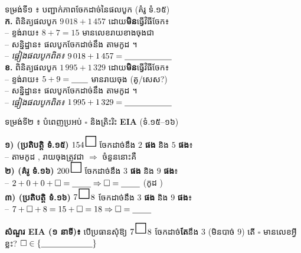 \documentclass[11pt,a4paper]{article}
\newcommand{\en}[1]{{\LatinFont #1}}
\newcommand{\enbf}[1]{{\LatinFont\textbf{#1}}}
\newcommand{\cnum}[1]{{\fontsize{10pt}{11pt}\selectfont\ding{\numexpr181+#1\relax}}\hspace{0.15em}}
\newcommand{\blank}[1]{\underline{\hspace{#1}}}
\newcommand{\numbox}{\tikz[baseline=-0.35ex]\draw[black,line width=0.85pt] (0,0) rectangle (0.42,0.42);}
\begin{document}
\vspace{2pt}
\begin{minipage}[t]{9.2cm}
  \vspace{0pt}
  \begin{tcolorbox}[
    enhanced, sharp corners, colback=white, colframe=black,
    boxrule=0.85pt, boxsep=2pt, top=5pt, bottom=6pt, left=5.5pt, right=5.5pt,
    equal height group=e4boxes
  ]
    {\muol\fontsize{8.7pt}{12.5pt}\selectfont ទម្រង់ទី១ ៖ បញ្ជាក់ភាពចែកដាច់នៃផលបូក (គំរូ ទំ.១៥)}\\[5pt]
    {\fontsize{8.7pt}{14.2pt}\selectfont
    \textbf{ក.} ពិនិត្យផលបូក $9\,018 + 1\,457$ ដោយ\textbf{មិន}ធ្វើវិធីចែក៖\\
    -- ខ្ទង់រាយ៖ $8 + 7 = 15$ មានលេខរាយខាងចុងជា \blank{0.7cm}\\
    -- សន្និដ្ឋាន៖ ផលបូកចែកដាច់នឹង \blank{0.7cm} តាមកូដ \blank{0.7cm} ។\\
    -- \textit{ផ្ទៀងផលបូកពិត៖} $9\,018 + 1\,457 = \blank{2.0cm}$\\[9pt]
    \textbf{ខ.} ពិនិត្យផលបូក $1\,995 + 1\,329$ ដោយ\textbf{មិន}ធ្វើវិធីចែក៖\\
    -- ខ្ទង់រាយ៖ $5 + 9 = \blank{0.7cm}$ មានរាយចុង \blank{0.7cm} (គូ/សេស?)\\
    -- សន្និដ្ឋាន៖ ផលបូកចែកដាច់នឹង \blank{0.7cm} តាមកូដ \blank{0.7cm} ។\\
    -- \textit{ផ្ទៀងផលបូកពិត៖} $1\,995 + 1\,329 = \blank{2.0cm}$}
  \end{tcolorbox}
\end{minipage}\hfill%
\begin{minipage}[t]{9.3cm}
  \vspace{0pt}
  \begin{tcolorbox}[
    enhanced, sharp corners, colback=white, colframe=black,
    boxrule=0.85pt, boxsep=2pt, top=5pt, bottom=6pt, left=5.5pt, right=5.5pt,
    equal height group=e4boxes
  ]
    {\muol\fontsize{8.7pt}{12.5pt}\selectfont ទម្រង់ទី២ ៖ បំពេញប្រអប់ $\square$ និងត្រិះរិះ \enbf{EIA} (ទំ.១៥--១៦)}\\[5pt]
    {\fontsize{8.7pt}{14.0pt}\selectfont
    \textbf{១) (ប្រតិបត្តិ ទំ.១៥)} $154\,\numbox$ ចែកដាច់នឹង $2$ \textbf{ផង} និង $5$ \textbf{ផង}៖\\
    -- តាមកូដ \cnum{1}, \cnum{2} រាយចុងត្រូវជា \blank{0.8cm} $\Rightarrow$ ចំនួននោះគឺ \blank{1.6cm}\\[5pt]
    \textbf{២) (គំរូ ទំ.១៦)} $200\,\numbox$ ចែកដាច់នឹង $3$ \textbf{ផង} និង $9$ \textbf{ផង}៖\\
    -- $2+0+0+\square = \blank{0.8cm} \Rightarrow \square = \blank{0.8cm}$ (កូដ \blank{0.9cm})\\[5pt]
    \textbf{៣) (ប្រតិបត្តិ ទំ.១៦)} $7\,\numbox\,8$ ចែកដាច់នឹង $3$ \textbf{ផង} និង $9$ \textbf{ផង}៖\\
    -- $7+\square+8 = 15+\square = 18 \Rightarrow \square = \blank{0.8cm}$\\[6pt]
    \colorbox{panelgray}{\parbox{8.35cm}{\textbf{សំណួរ \en{EIA} (១ នាទី)៖} បើប្រធានសុំឱ្យ $7\,\numbox\,8$ ចែកដាច់\textbf{តែ}នឹង $3$ (មិនបាច់ $9$) តើ $\square$ មានលេខអ្វីខ្លះ? $\square \in \{\blank{2.2cm}\}$}}}
  \end{tcolorbox}
\end{minipage}
\end{document}
